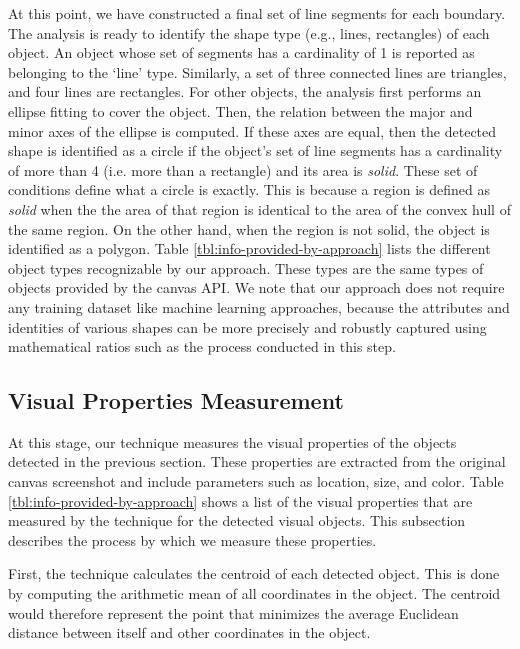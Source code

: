 At this point, we have constructed a final set of line segments for each boundary. The analysis is ready to identify the shape type (e.g., lines, rectangles) of each object. An object whose set of segments has a cardinality of 1 is reported as belonging to the `line' type. Similarly, a set of three connected lines are triangles, and four lines are rectangles. For other objects, the analysis first performs an ellipse fitting to cover the object. Then, the relation between the major and minor axes of the ellipse is computed. If these axes are equal, then the detected shape is identified as a circle if the object's set of line segments has a cardinality of more than 4 (i.e. more than a rectangle) and its area is \emph{solid}. These set of conditions define what a circle is exactly. This is because a  region is defined as \emph{solid} when the the area of that region is identical to the area of the convex hull of the same region. On the other hand, when the region is not solid, the object is identified as a polygon.
Table \ref{tbl:info-provided-by-approach} lists the different object types recognizable by our approach. These types are the same types of objects provided by the canvas API. We note that our approach does not require any training dataset like machine learning approaches, because the attributes and identities of various shapes can be more precisely and robustly captured using mathematical ratios such as the process conducted in this step.
 
\subsection{Visual Properties Measurement}
\label{subsec:viz-props}

At this stage, our technique measures the visual properties of the objects detected in the previous section. These properties are extracted from the original canvas screenshot and include parameters such as location, size, and color. Table \ref{tbl:info-provided-by-approach} shows a list of the visual properties that are measured by the technique for the detected visual objects. This subsection describes the process by which we measure these properties.

 First, the technique calculates the centroid of each detected object. This is done by computing the arithmetic mean of all coordinates in the object. The centroid would therefore represent the point that minimizes the average Euclidean distance between itself and other coordinates in the object.

